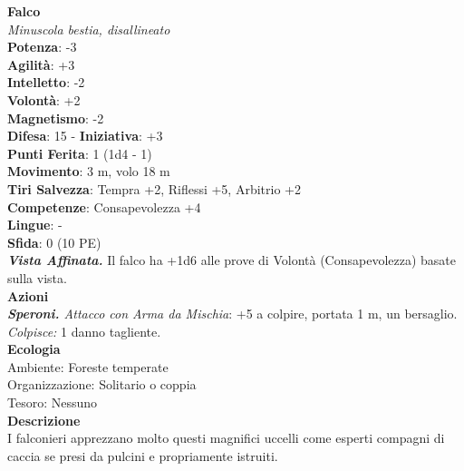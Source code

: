 \begin{multicols}{2}
\medskip\textbf{Falco}\\
\emph{Minuscola bestia, disallineato}\\
\textbf{Potenza}: -3\\
\textbf{Agilità}: +3\\
\textbf{Intelletto}: -2\\
\textbf{Volontà}: +2\\
\textbf{Magnetismo}: -2\\
\textbf{Difesa}: 15 - \textbf{Iniziativa}: +3\\
\textbf{Punti Ferita}: 1 (1d4 - 1)\\
\textbf{Movimento}: 3 m, volo 18 m\\
\textbf{Tiri Salvezza}: Tempra +2, Riflessi +5, Arbitrio +2 \\
\textbf{Competenze}: Consapevolezza +4\\
\textbf{Lingue}: -\\
\textbf{Sfida}: 0 (10 PE)\smallskip\\
\emph{\textbf{Vista Affinata.}} Il falco ha +1d6 alle prove di Volontà (Consapevolezza) basate sulla vista.\\
\smallskip\textbf{Azioni}\\
\emph{\textbf{Speroni.} Attacco con Arma da Mischia}: +5 a colpire, portata 1 m, un bersaglio.\\
\emph{Colpisce:} 1 danno tagliente. \\
\textbf{Ecologia}\\
Ambiente: Foreste temperate\\
Organizzazione: Solitario o coppia\\
Tesoro: Nessuno\\
\textbf{Descrizione}\\
I falconieri apprezzano molto questi magnifici uccelli come esperti compagni di caccia se presi da pulcini e propriamente istruiti. \\


\end{multicols}
